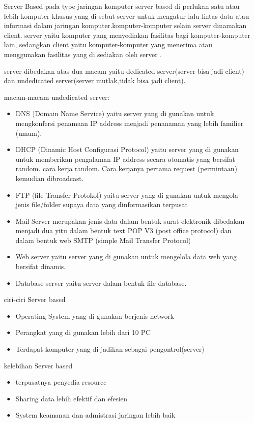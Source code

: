 Server Based
pada type jaringan komputer server based di perlukan satu atau lebih komputer khusus yang di sebut server untuk mengatur lalu lintas data atau informasi dalam jaringan komputer.komputer-komputer selain server dinamakan client. server yaitu komputer yang menyediakan fasilitas bagi komputer-komputer lain, sedangkan client yaitu komputer-komputer yang menerima atau menggunakan fasilitas yang di sediakan oleh server \cite{yudianto2007jaringan}.

server dibedakan atas dua macam yaitu dedicated server(server bisa jadi client) dan undedicated server(server mutlak,tidak bisa jadi client).

macam-macam undedicated server:
\begin{itemize}
  \item DNS (Domain Name Service) yaitu server yang di gunakan untuk mengkonfersi penamaan IP address menjadi penanaman yang lebih familier (umum).
  \item DHCP (Dinamic Host Configurasi Protocol) yaitu server yang di gunakan untuk memberikan pengalaman IP address secara otomatis yang bersifat random. cara kerja random. Cara kerjanya pertama request (permintaan) kemudian dibroadcast.
  \item  FTP (file Transfer Protokol) yaitu server yang di gunakan untuk mengola jenis file/folder supaya data yang dinformasikan terpusat
  \item Mail Server merupakan jenis data dalam bentuk surat elektronik dibedakan menjadi dua yitu dalam bentuk text POP V3 (post office protocol) dan dalam bentuk web SMTP (simple Mail Transfer Protocol)
  \item Web server yaitu server yang di gunakan untuk mengelola data web yang bersifat dinamis.
  \item Database server yaitu server dalam bentuk file database.
\end{itemize} 

ciri-ciri Server based
\begin{itemize}
  \item Operating System yang di gunakan berjenis network
  \item Perangkat yang di gunakan lebih dari 10 PC
  \item Terdapat komputer yang di jadikan sebagai pengontrol(server)\cite{wahyono2007building}
\end{itemize}

kelebihan Server based
\begin{itemize}
  \item terpusatnya penyedia resource
  \item Sharing data lebih efektif dan efesien
  \item System keamanan dan admistrasi jaringan lebih baik
\end{itemize}
